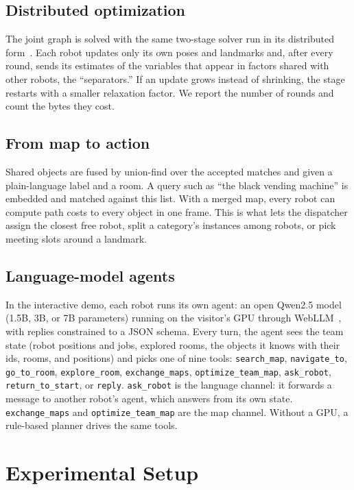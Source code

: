 \documentclass[conference]{IEEEtran}
\begin{document}
\subsection{Distributed optimization}
The joint graph is solved with the same two-stage solver run in its distributed form~\cite{choudhary2016icra,choudhary2017ijrr}.
Each robot updates only its own poses and landmarks and, after every round, sends its estimates of the variables that appear in factors shared with other robots, the ``separators.''
If an update grows instead of shrinking, the stage restarts with a smaller relaxation factor.
We report the number of rounds and count the bytes they cost.

\subsection{From map to action}
Shared objects are fused by union-find over the accepted matches and given a plain-language label and a room.
A query such as ``the black vending machine'' is embedded and matched against this list.
With a merged map, every robot can compute path costs to every object in one frame.
This is what lets the dispatcher assign the closest free robot, split a category's instances among robots, or pick meeting slots around a landmark.

\subsection{Language-model agents}
In the interactive demo, each robot runs its own agent: an open Qwen2.5 model~\cite{qwen2024qwen25} (1.5B, 3B, or 7B parameters) running on the visitor's GPU through WebLLM~\cite{ruan2024webllm}, with replies constrained to a JSON schema.
Every turn, the agent sees the team state (robot positions and jobs, explored rooms, the objects it knows with their ids, rooms, and positions) and picks one of nine tools: \texttt{search\_map}, \texttt{navigate\_to}, \texttt{go\_to\_room}, \texttt{explore\_room}, \texttt{exchange\_maps}, \texttt{optimize\_team\_map}, \texttt{ask\_robot}, \texttt{return\_to\_start}, or \texttt{reply}.
\texttt{ask\_robot} is the language channel: it forwards a message to another robot's agent, which answers from its own state.
\texttt{exchange\_maps} and \texttt{optimize\_team\_map} are the map channel.
Without a GPU, a rule-based planner drives the same tools.

\section{Experimental Setup}\label{sec:setup}
\end{document}
